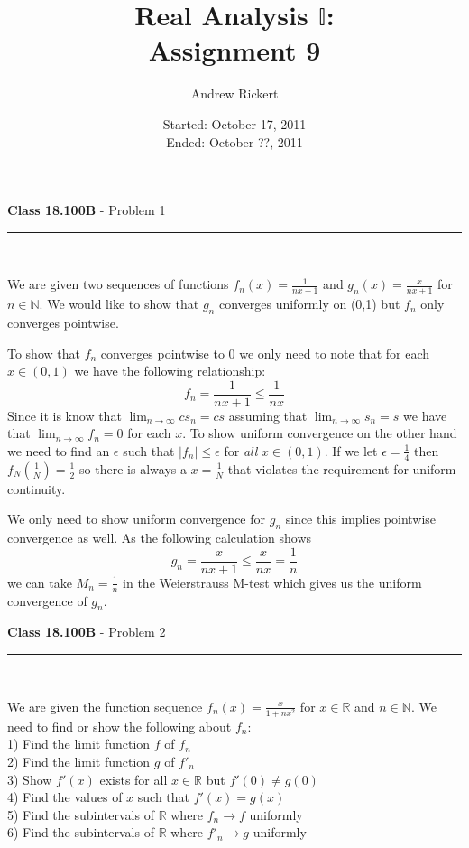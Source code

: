 \documentclass[11pt,reqno]{article}
\title{Real Analysis $\mathbb{I}$: \\ Assignment 9}
\author{Andrew Rickert}
\date{Started: October 17, 2011 \\ \hspace{1pt} Ended: October ??,  2011}                                           %
\begin{document}
\maketitle


\begin{flushleft} 
\textbf{Class 18.100B} - Problem 1\\
\rule{500pt}{1pt}\\
\end{flushleft} 

We are given two sequences of functions $f_n(x) = \frac{1}{nx + 1}$ and $g_n(x) = \frac{x}{nx+1}$ for $n \in \mathbb{N}$. We would like to show that $g_n$ converges uniformly on (0,1) but $f_n$ only converges pointwise.

To show that $f_n$ converges pointwise to 0 we only need to note that for each $x \in (0,1)$ we have the following relationship:
\[ f_n = \frac{1}{nx + 1} \le \frac{1}{nx}\]
Since it is know that $\lim_{n \to \infty} c s_n = c s$ assuming that $\lim_{n \to \infty}s_n = s$ we have that $\lim_{n \to \infty} f_n = 0$ for each $x$. To show uniform convergence on the other hand we need to find an $\epsilon$ such that $|f_n| \le \epsilon$ for \emph{all} $x \in (0,1)$. If we let $\epsilon = \frac{1}{4}$ then $f_N(\frac{1}{N}) = \frac{1}{2}$ so there is always a $x = \frac{1}{N}$ that violates the requirement for uniform continuity.

\indent We only need to show uniform convergence for $g_n$ since this implies pointwise convergence as well. As the following calculation shows
\[ g_n = \frac{x}{nx+1} \le \frac{x}{nx} = \frac{1}{n} \]
we can take $M_n = \frac{1}{n}$ in the Weierstrauss M-test which gives us the uniform convergence of $g_n$.

\vspace{15pt}
\begin{flushleft} 
\textbf{Class 18.100B} - Problem 2\\
\rule{500pt}{1pt}\\
\end{flushleft} 

We are given the function sequence $f_n(x) = \frac{x}{1+nx^2}$ for $x \in \mathbb{R}$ and $n \in \mathbb{N}$. We need to find or show the following about $f_n$:\\
1) Find the limit function $f$ of $f_n$\\
2) Find the limit function $g$ of $f'_n$\\
3) Show $f'(x)$ exists for all $x \in \mathbb{R}$ but $f'(0) \neq g(0)$\\
4) Find the values of $x$ such that $f'(x) = g(x)$\\
5) Find the subintervals of $\mathbb{R}$ where $f_n \to f$ uniformly\\
6) Find the subintervals of $\mathbb{R}$ where $f'_n \to g$ uniformly\\
\end{document}

